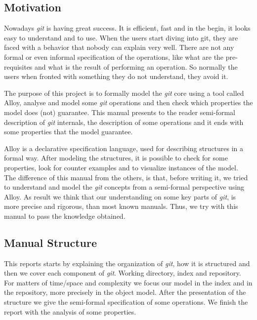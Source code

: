 \subsection{Motivation}
Nowadays \emph{git} is having great success. It is efficient, fast and
in the begin, it looks easy to understand and to use. When
the users start diving into git, they are faced with a behavior that
nobody can explain very well. There are not any formal or even informal
specification of the operations, like what are the pre-requisites and
what is the result of performing an operation. So normally the users
when fronted with something they do not understand, they avoid it.\par
The purpose of this project is to
formally model the \emph{git} core using a tool called 
Alloy, analyse and model some \emph{git}
operations and then check which properties the model does (not)
guarantee. This manual presents to the reader semi-formal description of
\emph{git} internals, the description of some operations and it ends with
some properties that the model guarantee.\par
Alloy is a declarative specification language, used for describing structures in 
a formal way. After modeling the structures, it is possible to
check for some properties, look for counter examples and to visualize 
instances of the model. \\

The difference of this manual from the others, is
that, before writing it, we tried to understand and model 
the \emph{git} concepts from a semi-formal perspective using Alloy. As result 
we think that our understanding on some key parts of \emph{git}, is more precise
and rigorous, than most known manuals. Thus, we try with this manual
to pass the knowledge obtained. \par 

\subsection{Manual Structure}
This reports starts by explaining the organization of \emph{git}, how
it is structured and then we cover each component of \emph{git}. 
Working directory, index and repository. For matters
of time/space and complexity we focus our model in the index and in the
repository, more precisely in the object model. 
After the presentation of the structure we give the semi-formal
specification of some operations. We finish the report with the
analysis of some properties.


